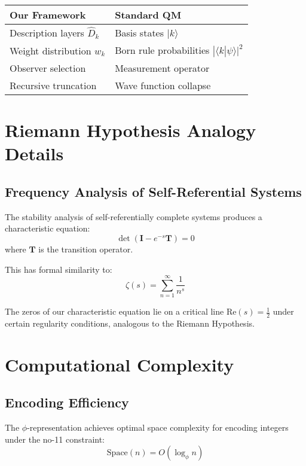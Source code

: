 \begin{table}[h]
\centering
\begin{tabular}{ll}
\hline
\textbf{Our Framework} & \textbf{Standard QM} \\
\hline
Description layers ${\hat{D}_k}$ & Basis states ${|k\rangle}$ \\
Weight distribution $w_k$ & Born rule probabilities $|\langle k|\psi\rangle|^2$ \\
Observer selection & Measurement operator \\
Recursive truncation & Wave function collapse \\
\hline
\end{tabular}
\end{table}

\section{Riemann Hypothesis Analogy Details}

\subsection{Frequency Analysis of Self-Referential Systems}

The stability analysis of self-referentially complete systems produces a characteristic equation:
\begin{equation}
\det(\mathbf{I} - e^{-s}\mathbf{T}) = 0
\end{equation}
where $\mathbf{T}$ is the transition operator.

This has formal similarity to:
\begin{equation}
\zeta(s) = \sum_{n=1}^{\infty} \frac{1}{n^s}
\end{equation}

The zeros of our characteristic equation lie on a critical line $\text{Re}(s) = \frac{1}{2}$ under certain regularity conditions, analogous to the Riemann Hypothesis.

\section{Computational Complexity}

\subsection{Encoding Efficiency}

\begin{theorem}
The $\phi$-representation achieves optimal space complexity for encoding integers under the no-11 constraint:
\begin{equation}
\text{Space}(n) = O(\log_\phi n)
\end{equation}
\end{theorem}

